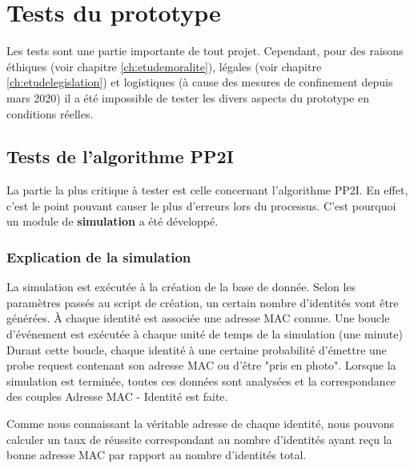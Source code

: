 \chapter{Tests du prototype}
\label{ch:test}

Les tests sont une partie importante de tout projet.
Cependant, pour des raisons éthiques (voir chapitre \ref{ch:etudemoralite}), légales (voir chapitre \ref{ch:etudelegislation}) et logistiques (à cause des mesures de confinement depuis mars 2020)
il a été impossible de tester les divers aspects du prototype en conditions réelles.

\section{Tests de l'algorithme PP2I}
La partie la plus critique à tester est celle concernant l'algorithme PP2I. 
En effet, c'est le point pouvant causer le plus d'erreurs lors du processus.
C'est pourquoi un module de \textbf{simulation} a été développé. 

\subsection{Explication de la simulation}
La simulation est exécutée à la création de la base de donnée.
Selon les paramètres passés au script de création, un certain nombre d'identités vont être générées. 
À chaque identité est associée une adresse MAC connue. 
Une boucle d'événement est exécutée à chaque unité de temps de la simulation (une minute)   
Durant cette boucle, chaque identité à une certaine probabilité d'émettre une probe request contenant son adresse MAC ou 
d'être "pris en photo". Lorsque la simulation est terminée, toutes ces données sont analysées et la correspondance des couples Adresse MAC - Identité est faite. 

Comme nous connaissant la véritable adresse de chaque identité, nous pouvons calculer un taux de réussite correspondant au nombre d'identités ayant reçu la bonne adresse MAC par rapport au nombre d'identités total.

